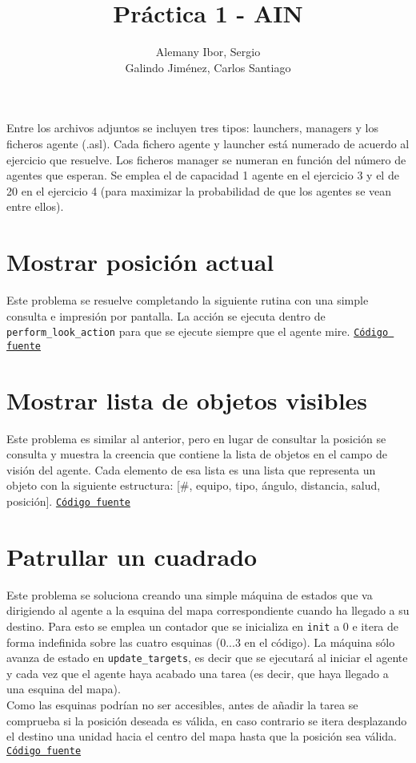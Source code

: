 \documentclass[12pt, a4paper]{article}
\title{Práctica 1 - AIN}
\author{Alemany Ibor, Sergio\\Galindo Jiménez, Carlos Santiago}
\begin{document}
    \maketitle
    
    Entre los archivos adjuntos se incluyen tres tipos: launchers, managers y los ficheros agente (.asl). Cada fichero agente y launcher está numerado de acuerdo al ejercicio que resuelve. Los ficheros manager se numeran en función del número de agentes que esperan. Se emplea el de capacidad 1 agente en el ejercicio 3 y el de 20 en el ejercicio 4 (para maximizar la probabilidad de que los agentes se vean entre ellos).
    \section{Mostrar posición actual}
    Este problema se resuelve completando la siguiente rutina con una simple consulta e impresión por pantalla. La acción se ejecuta dentro de \texttt{perform\_look\_action} para que se ejecute siempre que el agente mire. \href{https://github.com/kauron/etsinf3/blob/master/AIN/Lab1/jasonAgent_ALLIED_obj1.asl#L146}{\texttt{Código fuente}}
    
    \section{Mostrar lista de objetos visibles}
    Este problema es similar al anterior, pero en lugar de consultar la posición se consulta y muestra la creencia que contiene la lista de objetos en el campo de visión del agente. Cada elemento de esa lista es una lista que representa un objeto con la siguiente estructura: [\#, equipo, tipo, ángulo, distancia, salud, posición]. \href{https://github.com/kauron/etsinf3/blob/master/AIN/Lab1/jasonAgent_ALLIED_obj2.asl#L146}{\texttt{Código fuente}}
    
    \section{Patrullar un cuadrado}
    Este problema se soluciona creando una simple máquina de estados que va dirigiendo al agente a la esquina del mapa correspondiente cuando ha llegado a su destino. Para esto se emplea un contador que se inicializa en \texttt{init} a 0 e itera de forma indefinida sobre las cuatro esquinas (0...3 en el código). La máquina sólo avanza de estado en \texttt{update\_targets}, es decir que se ejecutará al iniciar el agente y cada vez que el agente  haya acabado una tarea (es decir, que haya llegado a una esquina del mapa).\\
    Como las esquinas podrían no ser accesibles, antes de añadir la tarea se comprueba si la posición deseada es válida, en caso contrario se itera desplazando el destino una unidad hacia el centro del mapa hasta que la posición sea válida. \href{https://github.com/kauron/etsinf3/blob/master/AIN/Lab1/jasonAgent\_ALLIED\_obj3.asl#L205}{\texttt{Código fuente}}
    
\end{document}
